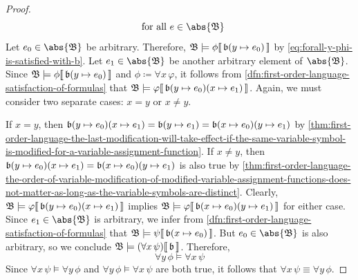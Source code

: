 \begin{proof}
\begin{equation}
        \ \ \text{for all} \ e \in \abs{\mathfrak{B}}
    \end{equation}
    Let \( e_{0} \in \abs{\mathfrak{B}} \) be arbitrary. Therefore, \( \folwffsatisfaction{\mathfrak{B}}{\phi}{ \folmodifiedvariableassignmentfunction{\mathfrak{b}}{y}{e_{0}} } \)
    by \eqref{eq:forall-y-phi-is-satisfied-with-b}.
    Let \( e_{1} \in \abs{\mathfrak{B}} \) be another arbitrary element of \( \abs{\mathfrak{B}} \).
    Since \( \folwffsatisfaction{\mathfrak{B}}{\phi}{ \folmodifiedvariableassignmentfunction{\mathfrak{b}}{y}{e_{0}} } \) and
    \( \phi \coloneq \forall x \, \varphi \), it follows from \cref{dfn:first-order-language-satisfaction-of-formulas} that
    \( \folwffsatisfaction{\mathfrak{B}}{\varphi}{ \folmodifiedvariableassignmentfunction{ \folmodifiedvariableassignmentfunction{\mathfrak{b}}{y}{e_{0}} }{x}{e_{1}} } \).
    Again, we must consider two separate cases: \( x = y \) or \( x \neq y \).

    \vspace{0.3cm}
    \noindent
    If \( x = y \), then \( \folmodifiedvariableassignmentfunction{ \folmodifiedvariableassignmentfunction{\mathfrak{b}}{y}{e_{0}} }{x}{e_{1}} =
    \folmodifiedvariableassignmentfunction{\mathfrak{b}}{y}{e_{1}} =
    \folmodifiedvariableassignmentfunction{ \folmodifiedvariableassignmentfunction{\mathfrak{b}}{x}{e_{0}} }{y}{e_{1}} \)
    by \cref{thm:first-order-language-the-last-modification-will-take-effect-if-the-same-variable-symbol-is-modified-for-a-variable-assignment-function}.
    If \( x \neq y \), then
    \( \folmodifiedvariableassignmentfunction{ \folmodifiedvariableassignmentfunction{\mathfrak{b}}{y}{e_{0}} }{x}{e_{1}} =
    \folmodifiedvariableassignmentfunction{ \folmodifiedvariableassignmentfunction{\mathfrak{b}}{x}{e_{0}} }{y}{e_{1}} \) is also true
    by \cref{thm:first-order-language-the-order-of-variable-modification-of-modified-variable-assignment-functions-does-not-matter-as-long-as-the-variable-symbols-are-distinct}.
    Clearly,
    \( \folwffsatisfaction{\mathfrak{B}}{\varphi}{ \folmodifiedvariableassignmentfunction{ \folmodifiedvariableassignmentfunction{\mathfrak{b}}{y}{e_{0}} }{x}{e_{1}} } \)
    implies
    \( \folwffsatisfaction{\mathfrak{B}}{\varphi}{ \folmodifiedvariableassignmentfunction{ \folmodifiedvariableassignmentfunction{\mathfrak{b}}{x}{e_{0}} }{y}{e_{1}} } \)
    for either case.
    Since \( e_{1} \in \abs{\mathfrak{B}} \) is arbitrary, we infer from \cref{dfn:first-order-language-satisfaction-of-formulas} that
    \( \folwffsatisfaction{\mathfrak{B}}{\psi}{ \folmodifiedvariableassignmentfunction{\mathfrak{b}}{x}{e_{0}} } \).
    But \( e_{0} \in \abs{\mathfrak{B}} \) is also arbitrary, so we conclude
    \( \folwffsatisfaction{\mathfrak{B}}{ \mleft( \forall x \, \psi \mright) }{\mathfrak{b}} \).
    Therefore,
    \begin{equation*}
        \forall y \, \phi \models \forall x \, \psi
    \end{equation*}
    Since \( \forall x \, \psi \models \forall y \, \phi \) and \( \forall y \, \phi \models \forall x \, \psi \) are both true,
    it follows that \( \forall x \, \psi \equiv \forall y \, \phi \).


\end{proof}
